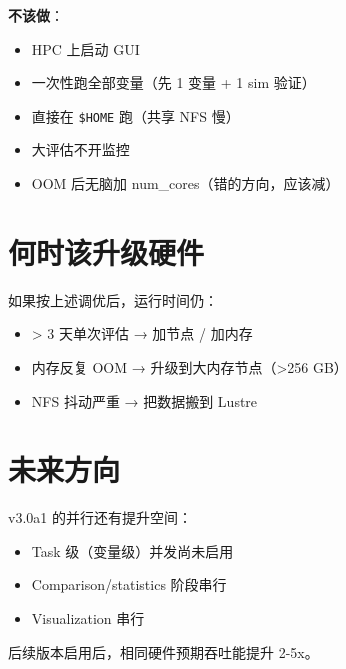 \textbf{不该做}：

\begin{itemize}
  \item HPC 上启动 GUI
  \item 一次性跑全部变量（先 1 变量 + 1 sim 验证）
  \item 直接在 \texttt{\$HOME} 跑（共享 NFS 慢）
  \item 大评估不开监控
  \item OOM 后无脑加 num\_cores（错的方向，应该减）
\end{itemize}

\section{何时该升级硬件}

如果按上述调优后，运行时间仍：

\begin{itemize}
  \item > 3 天单次评估 → 加节点 / 加内存
  \item 内存反复 OOM → 升级到大内存节点（\textgreater 256 GB）
  \item NFS 抖动严重 → 把数据搬到 Lustre
\end{itemize}

\section{未来方向}

\openbench{} v3.0a1 的并行还有提升空间：

\begin{itemize}
  \item Task 级（变量级）并发尚未启用
  \item Comparison/statistics 阶段串行
  \item Visualization 串行
\end{itemize}

后续版本启用后，相同硬件预期吞吐能提升 2-5x。

